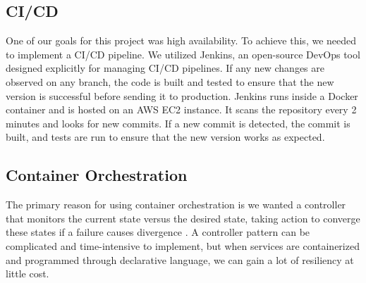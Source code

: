 \subsection{CI/CD}
One of our goals for this project was high availability. To achieve this, we needed to implement a CI/CD pipeline. We utilized Jenkins, an open-source DevOps tool designed explicitly for managing CI/CD pipelines. If any new changes are observed on any branch, the code is built and tested to ensure that the new version is successful before sending it to production. Jenkins runs inside a Docker container and is hosted on an AWS EC2 instance. It scans the repository every 2 minutes and looks for new commits. If a new commit is detected, the commit is built, and tests are run to ensure that the new version works as expected.

\subsection{Container Orchestration}
The primary reason for using container orchestration is we wanted a controller that monitors the current state versus the desired state, taking action to converge these states if a failure causes divergence \cite{burns2016borg}.
A controller pattern can be complicated and time-intensive to implement,
but when services are containerized and programmed through declarative language, 
we can gain a lot of resiliency at little cost.